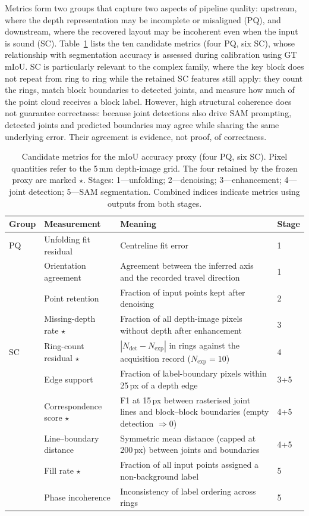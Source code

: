 \documentclass[a4paper,fleqn]{cas-dc}
\begin{document}
Metrics form two groups that capture two aspects of pipeline quality: upstream, where the depth representation may be incomplete or misaligned (PQ), and downstream, where the recovered layout may be incoherent even when the input is sound (SC). Table~\ref{tab:candidate-features} lists the ten candidate metrics (four PQ, six SC), whose relationship with segmentation accuracy is assessed during calibration using GT mIoU. SC is particularly relevant to the complex family, where the key block does not repeat from ring to ring while the retained SC features still apply: they count the rings, match block boundaries to detected joints, and measure how much of the point cloud receives a block label. However, high structural coherence does not guarantee correctness: because joint detections also drive SAM prompting, detected joints and predicted boundaries may agree while sharing the same underlying error. Their agreement is evidence, not proof, of correctness.

\begin{table}[t]
\caption{Candidate metrics for the mIoU accuracy proxy (four PQ, six SC). Pixel quantities refer to the 5\,mm depth-image grid. The four retained by the frozen proxy are marked $\star$. Stages: 1---unfolding; 2---denoising; 3---enhancement; 4---joint detection; 5---SAM segmentation. Combined indices indicate metrics using outputs from both stages.}
\label{tab:candidate-features}
\centering
\small
\setlength{\tabcolsep}{3pt}
\begin{tabular}{p{} p{} p{} p{}}
\toprule
Group & Measurement & Meaning & Stage \\
\midrule
PQ & Unfolding fit residual & Centreline fit error & 1 \\
 & Orientation agreement & Agreement between the inferred axis and the recorded travel direction & 1 \\
 & Point retention & Fraction of input points kept after denoising & 2 \\
 & Missing-depth rate $\star$ & Fraction of all depth-image pixels without depth after enhancement & 3 \\
SC & Ring-count residual $\star$ & $|N_{\mathrm{det}}-N_{\mathrm{exp}}|$ in rings against the acquisition record ($N_{\mathrm{exp}}=10$) & 4 \\
 & Edge support & Fraction of label-boundary pixels within 25\,px of a depth edge & 3+5 \\
 & Correspondence score $\star$ & F1 at 15\,px between rasterised joint lines and block--block boundaries (empty detection $\Rightarrow 0$) & 4+5 \\
 & Line--boundary distance & Symmetric mean distance (capped at 200\,px) between joints and boundaries & 4+5 \\
 & Fill rate $\star$ & Fraction of all input points assigned a non-background label & 5 \\
 & Phase incoherence & Inconsistency of label ordering across rings & 5 \\
\bottomrule
\end{tabular}
\end{table}
\end{document}
